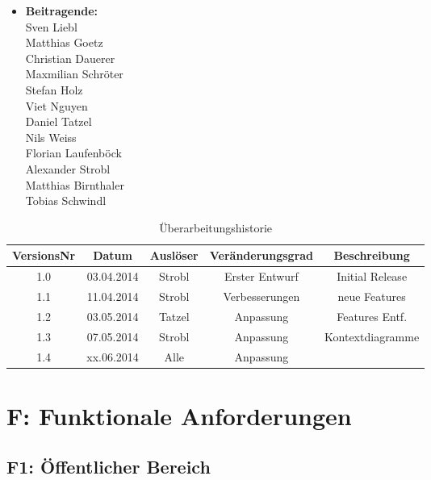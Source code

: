 \documentclass[10pt,a4paper]{scrartcl}
\begin{document}
\newcommand{\Version}{1.2}






\newpage
\begin{itemize}
\item[] \textbf{\large Beitragende:}\\
Sven Liebl\\
Matthias Goetz\\
Christian Dauerer\\
Maxmilian Schröter\\
Stefan Holz\\
Viet Nguyen\\
Daniel Tatzel\\
Nils Weiss\\
Florian Laufenböck\\
Alexander Strobl\\
Matthias Birnthaler\\
Tobias Schwindl
\end{itemize}

\bigskip

\begin{table}[!h]
 	\centering
	\begin{tabular}{|c|c|c|c||c|}
	\hline
	\textbf{VersionsNr} &  \textbf{Datum} & \textbf{Auslöser} & \textbf{Veränderungsgrad} & \textbf{Beschreibung} \\
	\hline
	1.0 & 03.04.2014 & Strobl & Erster Entwurf & Initial Release \\
	\hline
	1.1 & 11.04.2014 & Strobl & Verbesserungen & neue Features \\
	\hline
	1.2 & 03.05.2014 & Tatzel & Anpassung & Features Entf. \\
	\hline
	1.3 & 07.05.2014 & Strobl & Anpassung & Kontextdiagramme \\
	\hline
	1.4 & xx.06.2014 & Alle & Anpassung & \\
	\hline
	\end{tabular}

\caption{Überarbeitungshistorie}
\end{table}

\newpage
\tableofcontents


\newpage
\section{F: Funktionale Anforderungen}


\subsection{F1: Öffentlicher Bereich}
\end{document}
